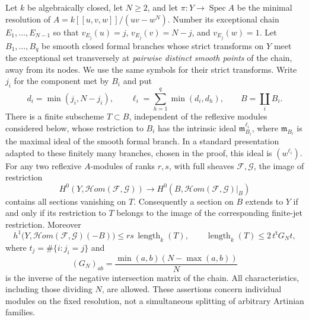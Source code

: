 \begin{proposition}
\label{D:A-chain-finite-jet-framing}
Let $k$ be algebraically closed, let $N\ge2$, and let
$\pi:Y\to\operatorname{Spec}A$ be the minimal resolution of
$A=k[[u,v,w]]/(uv-w^N)$.  Number its exceptional chain
$E_1,\ldots,E_{N-1}$ so that
$v_{E_j}(u)=j$, $v_{E_j}(v)=N-j$, and $v_{E_j}(w)=1$.
Let $B_1,\ldots,B_q$ be smooth closed formal branches whose strict
transforms on $Y$ meet the exceptional set transversely at
\emph{pairwise distinct smooth points} of the chain, away from its nodes.
We use the same symbols for their strict transforms.
Write $j_i$ for the component met by $B_i$ and put
\[
 d_i=\min(j_i,N-j_i),\qquad
 \ell_i=\sum_{h=1}^q\min(d_i,d_h),\qquad B=\coprod_iB_i.
                                                        \tag{D.JF.1}
\]
There is a finite subscheme $T\subset B$, independent of the
reflexive modules considered below, whose restriction to $B_i$
has the intrinsic ideal $\mathfrak m_{B_i}^{\ell_i}$, where
$\mathfrak m_{B_i}$ is the maximal ideal of the smooth formal branch.
In a standard presentation adapted to these finitely many branches,
chosen in the proof, this ideal is $(w^{\ell_i})$.
For any two reflexive $A$-modules of ranks $r,s$, with full
sheaves $\mathcal F,\mathcal G$, the image of restriction
\[
 H^0(Y,\mathcal Hom(\mathcal F,\mathcal G))
       \longrightarrow H^0(B,\mathcal Hom(\mathcal F,\mathcal G)|_B)
                                                        \tag{D.JF.2}
\]
contains all sections vanishing on $T$.  Consequently a section
on $B$ extends to $Y$ if and only if its restriction to $T$
belongs to the image of the corresponding finite-jet restriction.
Moreover
\[
 h^1\bigl(Y,\mathcal Hom(\mathcal F,\mathcal G)(-B)\bigr)
            \le rs\,\operatorname{length}_k(T),
 \qquad
 \operatorname{length}_k(T)\le 2\,t^{\mathsf t}G_Nt,
                                                        \tag{D.JF.3}
\]
where $t_j=\#\{i:j_i=j\}$ and
\[
 (G_N)_{ab}=\frac{\min(a,b)(N-\max(a,b))}{N}
\]
is the inverse of the negative intersection matrix of the chain.
All characteristics, including those dividing $N$, are allowed.
These assertions concern individual modules on the fixed resolution,
not a simultaneous splitting of arbitrary Artinian families.
\end{proposition}
